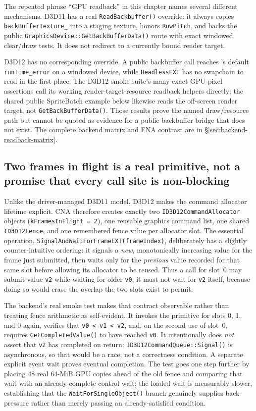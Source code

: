 The repeated phrase ``GPU readback'' in this chapter names several different mechanisms.
D3D11 has a real \texttt{ReadBackbuffer()} override: it always copies
\texttt{backBufferTexture\_} into a staging texture, honors \texttt{RowPitch}, and backs the
public \texttt{GraphicsDevice::GetBackBuffer\allowbreak Data()} route with exact windowed
clear/draw
tests. It does not redirect to a currently bound render target.

D3D12 has no corresponding override. A public backbuffer call reaches
's default \texttt{runtime\_error} on a windowed device, while
\texttt{HeadlessEXT} has no swapchain to read in the first place. The D3D12 smoke suite's many
exact GPU pixel assertions call its working render-target-resource readback helpers directly;
the shared public SpriteBatch example below likewise reads the off-screen render target, not
\texttt{GetBackBufferData()}. Those results prove the named draw/resource path but cannot be
quoted as evidence for a public backbuffer bridge that does not exist. The complete backend
matrix and FNA contrast are in \S\ref{sec:backend-readback-matrix}.

\subsection{Two frames in flight is a real primitive, not a promise that every call site is non-blocking}

Unlike the driver-managed D3D11 model, D3D12 makes the command allocator lifetime explicit.
CNA therefore creates exactly two \texttt{ID3D12CommandAllocator} objects
(\texttt{kFramesInFlight = 2}), one reusable graphics command list, one shared
\texttt{ID3D12Fence}, and one remembered fence value per allocator slot.  The essential
operation, \texttt{SignalAndWaitForFrameEXT(frameIndex)}, deliberately has a slightly
counter-intuitive ordering: it signals a \emph{new}, monotonically increasing value for the
frame just submitted, then waits only for the \emph{previous} value recorded for that same
slot before allowing its allocator to be reused.  Thus a call for slot~0 may submit value
\texttt{v2} while waiting for older \texttt{v0}; it must not wait for \texttt{v2} itself,
because doing so would erase the overlap the two slots exist to permit.

The backend's real smoke test makes that contract observable rather than treating fence
arithmetic as self-evident.  It invokes the primitive for slots 0, 1, and 0 again, verifies
that \texttt{v0 < v1 < v2}, and, on the second use of slot~0, requires
\texttt{GetCompletedValue()} to have reached \texttt{v0}.  It intentionally does \emph{not}
assert that \texttt{v2} has completed on return: \texttt{ID3D12CommandQueue::Signal()} is
asynchronous, so that would be a race, not a correctness condition.  A separate explicit
event wait proves eventual completion.  The test goes one step further by placing 48 real
64-MiB GPU copies ahead of the old fence and comparing that wait with an already-complete
control wait; the loaded wait is measurably slower, establishing that the
\texttt{WaitForSingleObject()} branch genuinely supplies back-pressure rather than merely
passing an already-satisfied condition.


